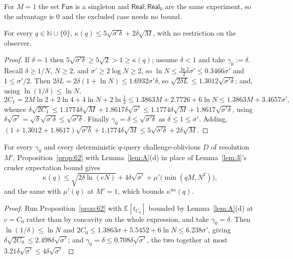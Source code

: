 \documentclass{aicr-solution}
\newcommand{\Fun}{\mathsf{Fun}}
\newcommand{\Real}{\mathsf{Real}}
\newcommand{\Exp}{\mathbb{E}}
\newcommand{\kna}{\kappa^{\mathrm{na}}}
\begin{document}
For $M = 1$ the set $\Fun$ is a singleton and $\Real, \Real_0$ are the same
experiment, so the advantage is $0$ and the excluded case needs no bound.

\begin{corollary}\label{cor:Dp}
For every $q \in \mathbb{N} \cup \{0\}$,
$\kappa(q) \le 5\sqrt{\sigma'\delta} + 2\delta\sqrt{M}$, with no restriction on the
observer.
\end{corollary}

\begin{proof}
If $\delta = 1$ then $5\sqrt{\sigma'\delta} \ge 5\sqrt2 > 1 \ge \kappa(q)$; assume
$\delta < 1$ and take $\gamma_0 := \delta$. Recall $\delta \ge 1/N$, $N \ge 2$, and
$\sigma' \ge 2\log N \ge 2$, so $\ln N \le \frac{\ln 2}{2}\sigma' \le 0.3466\sigma'$
and $1 \le \sigma'/2$. Then $2\delta L = 2\delta(1 + \ln N) \le 1.6932\sigma'\delta$,
so $\sqrt{2\delta L} \le 1.3012\sqrt{\sigma'\delta}$; and, using
$\ln(1/\delta) \le \ln N$,
\[
  2C_1 = 2M\ln 2 + 2\ln 4 + 4\ln N + 2\ln\tfrac1\delta
  \le 1.3863M + 2.7726 + 6\ln N \le 1.3863M + 3.4657\sigma',
\]
whence
$\delta\sqrt{2C_1} \le 1.1774\delta\sqrt{M} + 1.8617\delta\sqrt{\sigma'}
\le 1.1774\delta\sqrt{M} + 1.8617\sqrt{\sigma'\delta}$, using
$\delta\sqrt{\sigma'} = \sqrt{\delta}\sqrt{\sigma'\delta} \le \sqrt{\sigma'\delta}$.
Finally $\gamma_0 = \delta \le \sqrt{\sigma'\delta}$ as $\delta \le 1 \le \sigma'$.
Adding, $(1 + 1.3012 + 1.8617)\sqrt{\sigma'\delta} + 1.1774\delta\sqrt{M}
\le 5\sqrt{\sigma'\delta} + 2\delta\sqrt{M}$.
\end{proof}

\begin{theorem}\label{thm:ApBp}
For every $\gamma_0$ and every deterministic $q$-query challenge-oblivious $D$ of
resolution $M'$, Proposition~\ref{prop:62} with Lemma~\ref{lem:A}(d) in place of
Lemma~\ref{lem:3}'s cruder expectation bound gives
\[
  \kappa(q) \le \sqrt{2\delta\ln(eN)} + 4\delta\sqrt{\sigma'}
  + \mu'\bigl(\min(qM,N^{2})\bigr),
\]
and the same with $\mu'(q)$ at $M' = 1$, which bounds $\kna(q)$.
\end{theorem}

\begin{proof}
Run Proposition~\ref{prop:62} with $\Exp[t_{C_0}]$ bounded by
Lemma~\ref{lem:A}(d) at $c = C_0$ rather than by concavity on the whole
expression, and take $\gamma_0 = \delta$. Then $\ln(1/\delta) \le \ln N$ and
$2C_0 \le 1.3863\sigma + 5.5452 + 6\ln N \le 6.238\sigma'$, giving
$\delta\sqrt{2C_0} \le 2.498\delta\sqrt{\sigma'}$; and
$\gamma_0 = \delta \le 0.708\delta\sqrt{\sigma'}$, the two together at most
$3.21\delta\sqrt{\sigma'} \le 4\delta\sqrt{\sigma'}$.
\end{proof}
\end{document}
